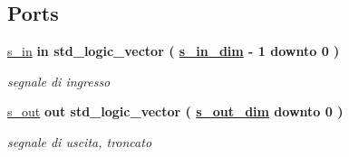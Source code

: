\subsection*{Ports}
 \begin{DoxyCompactItemize}
\item 
\hyperlink{group___truncation_ga6d6bd3ddfff26c223f1752f25545e304}{s\+\_\+in}  {\bfseries {\bfseries \textcolor{vhdlchar}{in}\textcolor{vhdlchar}{ }}} {\bfseries \textcolor{vhdlchar}{std\+\_\+logic\+\_\+vector}\textcolor{vhdlchar}{ }\textcolor{vhdlchar}{(}\textcolor{vhdlchar}{ }\textcolor{vhdlchar}{ }\textcolor{vhdlchar}{ }\textcolor{vhdlchar}{ }{\bfseries \hyperlink{group___truncation_gad3d18243ad6fe53a2277e2aa9b94ca45}{s\+\_\+in\+\_\+dim}} \textcolor{vhdlchar}{-\/}\textcolor{vhdlchar}{ } \textcolor{vhdldigit}{1} \textcolor{vhdlchar}{ }\textcolor{vhdlchar}{downto}\textcolor{vhdlchar}{ }\textcolor{vhdlchar}{ } \textcolor{vhdldigit}{0} \textcolor{vhdlchar}{ }\textcolor{vhdlchar}{)}\textcolor{vhdlchar}{ }} 
\begin{DoxyCompactList}\small\item\em segnale di ingresso \end{DoxyCompactList}\item 
\hyperlink{group___truncation_ga7c0b5e84820296cfa624ce710d19debd}{s\+\_\+out}  {\bfseries {\bfseries \textcolor{vhdlchar}{out}\textcolor{vhdlchar}{ }}} {\bfseries \textcolor{vhdlchar}{std\+\_\+logic\+\_\+vector}\textcolor{vhdlchar}{ }\textcolor{vhdlchar}{(}\textcolor{vhdlchar}{ }\textcolor{vhdlchar}{ }\textcolor{vhdlchar}{ }\textcolor{vhdlchar}{ }{\bfseries \hyperlink{group___truncation_ga8b62f8bfecb0fab845995b8b051101bc}{s\+\_\+out\+\_\+dim}} \textcolor{vhdlchar}{ }\textcolor{vhdlchar}{downto}\textcolor{vhdlchar}{ }\textcolor{vhdlchar}{ } \textcolor{vhdldigit}{0} \textcolor{vhdlchar}{ }\textcolor{vhdlchar}{)}\textcolor{vhdlchar}{ }} 
\begin{DoxyCompactList}\small\item\em segnale di uscita, troncato \end{DoxyCompactList}\end{DoxyCompactItemize}
